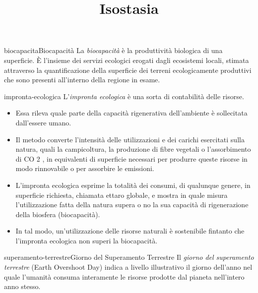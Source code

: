 \documentclass[preview]{standalone}
\begin{document}
\title{Isostasia}
\genpage

\begin{snippetdefinition}{biocapacita}{Biocapacità}
    La \textit{biocapacità} è la produttività biologica di una superficie. È
    l'insieme dei servizi ecologici erogati dagli ecosistemi locali, stimata
    attraverso la quantificazione della superficie dei terreni
    ecologicamente produttivi che sono presenti all'interno della regione
    in esame.
\end{snippetdefinition}


\begin{snippet}{impronta-ecologica}
    L'\textit{impronta ecologica} è una sorta di contabilità delle risorse.
    \begin{itemize}
        \item Essa rileva quale parte della capacità rigenerativa
            dell'ambiente è sollecitata dall'essere umano.
        \item Il metodo converte l'intensità delle utilizzazioni e dei
            carichi esercitati sulla natura, quali la campicoltura, la
            produzione di fibre vegetali o l'assorbimento di CO 2 , in
            equivalenti di superficie necessari per produrre queste
            risorse in modo rinnovabile o per assorbire le emissioni.
        \item L'impronta ecologica esprime la totalità dei consumi, di qualunque
            genere, in superficie richiesta, chiamata ettaro globale, e mostra
            in quale misura l'utilizzazione fatta della natura supera o no la sua
            capacità di rigenerazione della biosfera (biocapacità). 
        \item In tal modo, un'utilizzazione delle risorse naturali è sostenibile
            fintanto che l'impronta ecologica non superi la biocapacità.
    \end{itemize}
\end{snippet}

\begin{snippetdefinition}{superamento-terrestre}{Giorno del Superamento Terrestre}
    Il \textit{giorno del superamento terrestre} (Earth Overshoot Day)
    indica a livello illustrativo il giorno dell'anno nel quale l'umanità
    consuma interamente le risorse prodotte dal pianeta nell'intero anno stesso. 
\end{snippetdefinition}

\end{document}
